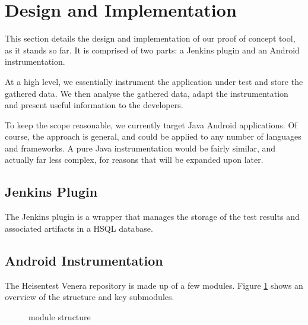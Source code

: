 \section{Design and Implementation}
\label{sec:imp}

This section details the design and implementation of our proof of concept tool,
as it stands so far. It is comprised of two parts: a Jenkins plugin and an
Android instrumentation.

At a high level, we essentially instrument the application under test and store
the gathered data. We then analyse the gathered data, adapt the instrumentation
and present useful information to the developers.

To keep the scope reasonable, we currently target Java Android applications. Of
course, the approach is general, and could be applied to any number of languages
and frameworks. A pure Java instrumentation would be fairly similar, and
actually far less complex, for reasons that will be expanded upon later.


\subsection{Jenkins Plugin}

The Jenkins plugin is a wrapper that manages the storage of the test results and
associated artifacts in a HSQL database.


\subsection{Android Instrumentation}

The Heisentest Venera repository\cite{heisentestInstrumentation} is made up of
a few modules. Figure \ref{fig:repo_structure} shows an overview of the
structure and key submodules.

\begin{figure}[h]
\caption{\heisentest module structure}
\label{fig:repo_structure}
\end{figure}


